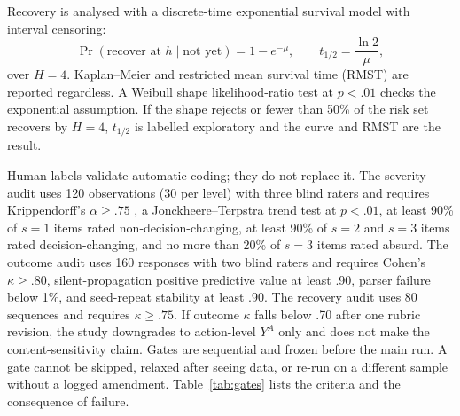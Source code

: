 \documentclass[11pt,a4paper]{article}
\begin{document}
Recovery is analysed with a discrete-time exponential survival model with interval censoring:
\begin{equation}
\Pr(\text{recover at }h \mid \text{not yet}) = 1-e^{-\mu},
\qquad
t_{1/2} = \frac{\ln 2}{\mu},
\label{eq:recovery}
\end{equation}
over $H=4$. Kaplan--Meier and restricted mean survival time (RMST) are reported regardless. A Weibull shape
likelihood-ratio test at $p<.01$ checks the exponential assumption. If the shape rejects or fewer
than 50\% of the risk set recovers by $H=4$, $t_{1/2}$ is labelled exploratory and the curve and
RMST are the result.

Human labels validate automatic coding; they do not replace it. The severity audit uses 120
observations (30 per level) with three blind raters and requires Krippendorff's $\alpha \ge .75$
\cite{krippendorff}, a Jonckheere--Terpstra trend test at $p<.01$, at least 90\% of $s=1$ items
rated non-decision-changing, at least 90\% of $s=2$ and $s=3$ items rated decision-changing, and no
more than 20\% of $s=3$ items rated absurd. The outcome audit uses 160 responses with two blind
raters and requires Cohen's $\kappa \ge .80$, silent-propagation positive predictive value at least
.90, parser failure below 1\%, and seed-repeat stability at least .90. The recovery audit uses 80
sequences and requires $\kappa \ge .75$. If outcome $\kappa$ falls below .70 after one rubric
revision, the study downgrades to action-level $Y^{A}$ only and does not make the
content-sensitivity claim. Gates are sequential and frozen before the main run. A gate cannot be skipped, relaxed after seeing
data, or re-run on a different sample without a logged amendment. Table~\ref{tab:gates} lists the
criteria and the consequence of failure.
\end{document}
